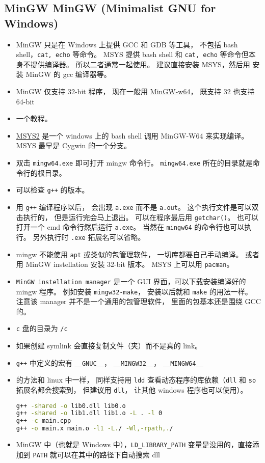 \subsection{MinGW MinGW (Minimalist GNU for Windows)}
\begin{itemize}
\item MinGW 只是在 Windows 上提供 GCC 和 GDB 等工具， 不包括 bash shell，\verb`cat, echo` 等命令。 MSYS 提供 bash shell 和 \verb`cat, echo` 等命令但本身不提供编译器。 所以二者通常一起使用。 建议直接安装 MSYS，然后用  安装 MinGW 的 gcc 编译器等。
\item MinGW 仅支持 32-bit 程序， 现在一般用 \href{https://www.mingw-w64.org/}{MinGW-w64}， 既支持 32 也支持 64-bit
\item 一个\href{https://www3.ntu.edu.sg/home/ehchua/programming/howto/Cygwin_HowTo.html}{教程}。
\item \href{https://www.msys2.org/}{MSYS2} 是一个 windows 上的 bash shell 调用 MinGW-W64 来实现编译。 MSYS 最早是 Cygwin 的一个分支。
\item 双击 \verb`mingw64.exe` 即可打开 mingw 命令行。 \verb`mingw64.exe` 所在的目录就是命令行的根目录。
\item 可以检查 \verb`g++` 的版本。
\item 用 \verb`g++` 编译程序以后， 会出现 \verb`a.exe` 而不是 \verb`a.out`。 这个执行文件是可以双击执行的， 但是运行完会马上退出。 可以在程序最后用 \verb`getchar()`。 也可以打开一个 cmd 命令行然后运行 \verb`a.exe`。 当然在 \verb`mingw64` 的命令行也可以执行。 另外执行时 \verb`.exe` 拓展名可以省略。
\item mingw 不能使用 \verb`apt` 或类似的包管理软件， 一切库都要自己手动编译。 或者用 MinGW instellation 安装 32-bit 版本。 MSYS 上可以用 \verb`pacman`。
\item \verb`MinGW instellation manager` 是一个 GUI 界面，可以下载安装编译好的 mingw 程序。 例如安装 \verb`mingw32-make`， 安装以后就和 \verb`make` 的用法一样。 注意该 manager 并不是一个通用的包管理软件， 里面的包基本还是围绕 GCC 的。
\item \verb`c` 盘的目录为 \verb`/c`
\item 如果创建 symlink 会直接复制文件（夹）而不是真的 link。
\item \verb`g++` 中定义的宏有 \verb`__GNUC__`， \verb`__MINGW32__`， \verb`__MINGW64__`
\item {}的方法和 linux 中一样， 同样支持用 \verb`ldd` 查看动态程序的库依赖（\verb`dll` 和 \verb`so` 拓展名都会搜索到， 但建议用 \verb`dll`， 让其他 windows 程序也可以使用）。
\begin{lstlisting}[language=bash]
g++ -shared -o lib0.dll lib0.o
g++ -shared -o lib1.dll lib1.o -L . -l 0
g++ -c main.cpp
g++ -o main.x main.o -l1 -L./ -Wl,-rpath,./
\end{lstlisting}
\item MinGW 中（也就是 Windows 中），\verb`LD_LIBRARY_PATH` 变量是没用的，直接添加到 \verb`PATH` 就可以在其中的路径下自动搜索 dll
\end{itemize}

